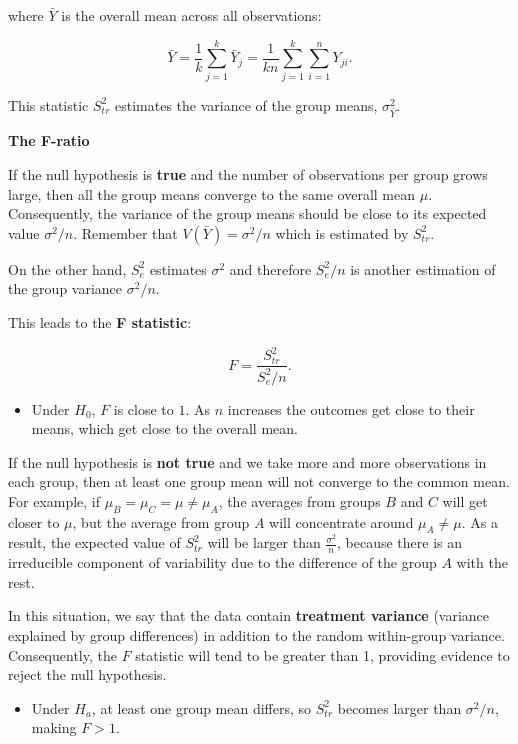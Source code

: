 \documentclass[
]{book}
\providecommand{\tightlist}{%
  \setlength{\itemsep}{0pt}\setlength{\parskip}{0pt}}
\begin{document}
where \(\bar{Y}\) is the overall mean across all observations:

\[
\bar{Y}=\frac{1}{k}\sum_{j=1}^k \bar{Y}_j = \frac{1}{kn}\sum_{j=1}^k \sum_{i=1}^n Y_{ji}.
\]

This statistic \(S^2_{tr}\) estimates the variance of the group means, \(\sigma^2_{\bar{Y}}\).

\textbf{The F-ratio}

If the null hypothesis is \textbf{true} and the number of observations per group grows large, then all the group means converge to the same overall mean \(\mu\). Consequently, the variance of the group means should be close to its expected value \(\sigma^2/n\). Remember that \(V(\bar{Y})=\sigma^2/n\) which is estimated by \(S_{tr}^2\).

On the other hand, \(S_e^2\) estimates \(\sigma^2\) and therefore \(S_e^2/n\) is another estimation of the group variance \(\sigma^2/n\).

This leads to the \textbf{F statistic}:

\[
F=\frac{S_{tr}^2}{S_e^2/n}.
\]

\begin{itemize}
\tightlist
\item
  Under \(H_0\), \(F\) is close to \(1\). As \(n\) increases the outcomes get close to their means, which get close to the overall mean.
\end{itemize}

If the null hypothesis is \textbf{not true} and we take more and more observations in each group, then at least one group mean will not converge to the common mean. For example, if \(\mu_B=\mu_C=\mu \neq \mu_A\), the averages from groups \(B\) and \(C\) will get closer to \(\mu\), but the average from group \(A\) will concentrate around \(\mu_A \neq \mu\). As a result, the expected value of \(S^2_{tr}\) will be larger than \(\frac{\sigma^2}{n}\), because there is an irreducible component of variability due to the difference of the group \(A\) with the rest.

In this situation, we say that the data contain \textbf{treatment variance} (variance explained by group differences) in addition to the random within-group variance. Consequently, the \(F\) statistic will tend to be greater than 1, providing evidence to reject the null hypothesis.

\begin{itemize}
\tightlist
\item
  Under \(H_a\), at least one group mean differs, so \(S_{tr}^2\) becomes larger than \(\sigma^2/n\), making \(F > 1\).
\end{itemize}
\end{document}
